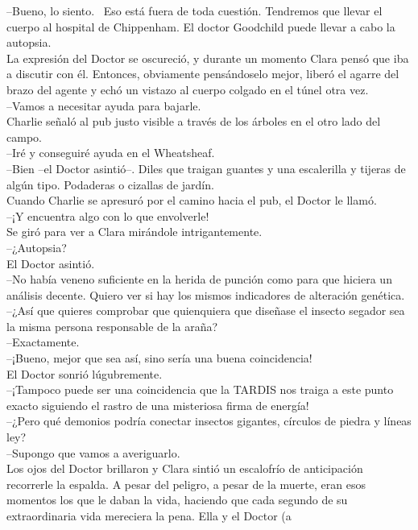 --Bueno, lo siento. ~Eso está fuera de toda cuestión. Tendremos que
llevar el cuerpo al hospital de Chippenham. El doctor Goodchild puede
llevar a cabo la autopsia.\\
La expresión del Doctor se oscureció, y durante un momento Clara pensó
que iba a discutir con él. Entonces, obviamente pensándoselo mejor,
liberó el agarre del brazo del agente y echó un vistazo al cuerpo
colgado en el túnel otra vez.\\
--Vamos a necesitar ayuda para bajarle.\\
Charlie señaló al pub justo visible a través de los árboles en el otro
lado del campo.\\
--Iré y conseguiré ayuda en el Wheatsheaf.\\
--Bien --el Doctor asintió--. Diles que traigan guantes y una
escalerilla y tijeras de algún tipo. Podaderas o cizallas de jardín.\\
Cuando Charlie se apresuró por el camino hacia el pub, el Doctor le
llamó.\\
--¡Y encuentra algo con lo que envolverle!\\
Se giró para ver a Clara mirándole intrigantemente.\\
--¿Autopsia?\\
El Doctor asintió.\\
--No había veneno suficiente en la herida de punción como para que
hiciera un análisis decente. Quiero ver si hay los mismos indicadores de
alteración genética.\\
--¿Así que quieres comprobar que quienquiera que diseñase el insecto
segador sea la misma persona responsable de la araña?\\
--Exactamente.\\
--¡Bueno, mejor que sea así, sino sería una buena coincidencia!\\
El Doctor sonrió lúgubremente.\\
--¡Tampoco puede ser una coincidencia que la TARDIS nos traiga a este
punto exacto siguiendo el rastro de una misteriosa firma de energía!\\
--¿Pero qué demonios podría conectar insectos gigantes, círculos de
piedra y líneas ley?\\
--Supongo que vamos a averiguarlo.\\
Los ojos del Doctor brillaron y Clara sintió un escalofrío de
anticipación recorrerle la espalda. A pesar del peligro, a pesar de la
muerte, eran esos momentos los que le daban la vida, haciendo que cada
segundo de su extraordinaria vida mereciera la pena. Ella y el Doctor (a
